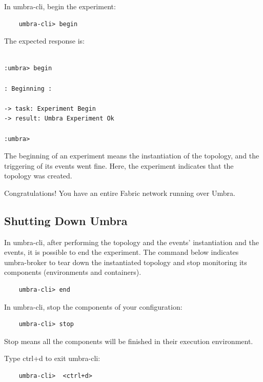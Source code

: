\documentclass[12pt,a4paper]{article}
\theoremstyle{definition}
\begin{document}
In umbra-cli, begin the experiment:

\begin{verbatim}
    umbra-cli> begin

\end{verbatim}


The expected response is:
\begin{verbatim}

:umbra> begin

: Beginning :

-> task: Experiment Begin
-> result: Umbra Experiment Ok

:umbra> 

\end{verbatim}

The beginning of an experiment means the instantiation of the topology, and the triggering of its events went fine. Here, the experiment indicates that the topology was created.

Congratulations! You have an entire Fabric network running over Umbra.

\subsection{Shutting Down Umbra}


In umbra-cli, after performing the topology and the events' instantiation and the events, it is possible to end the experiment. The command below indicates umbra-broker to tear down the instantiated topology and stop monitoring its components (environments and containers).

\begin{verbatim}
    umbra-cli> end

\end{verbatim}

In umbra-cli, stop the components of your configuration:

\begin{verbatim}
    umbra-cli> stop

\end{verbatim}

Stop means all the components will be finished in their execution environment.


Type ctrl+d to exit umbra-cli:

\begin{verbatim}
    umbra-cli>  <ctrl+d>

\end{verbatim}
\end{document}
